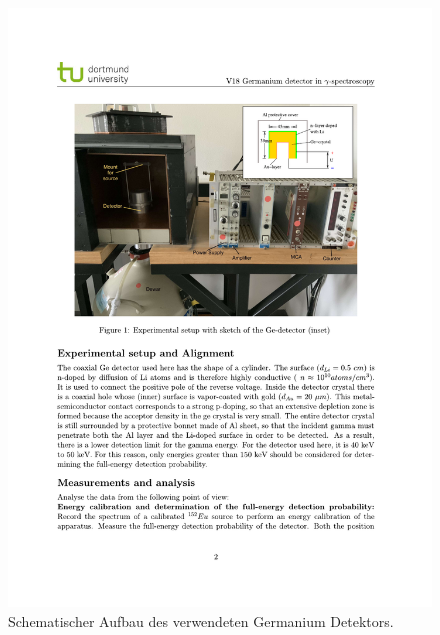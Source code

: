 \begin{figure}
    \centering
    \includegraphics[width = \textwidth]{content/pics/germanium_detector_skizze.pdf}
    \caption{Schematischer Aufbau des verwendeten Germanium Detektors.}
    \label{fig:germanium_detector}
\end{figure}

